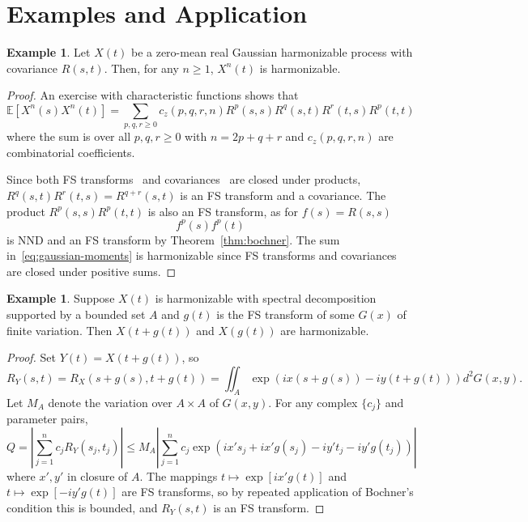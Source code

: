 \documentclass[11pt]{article}
\theoremstyle{plain}
\theoremstyle{definition}
\newtheorem{example}[theorem]{Example}
\theoremstyle{remark}
\begin{document}
\section{Examples and Application}

\begin{example}
Let $X(t)$ be a zero-mean real Gaussian harmonizable process with covariance $R(s,t)$. Then, for any $n \geq 1$, $X^n(t)$ is harmonizable.
\end{example}

\begin{proof}
An exercise with characteristic functions shows that
\begin{equation}
\mathbb{E}[X^n(s)X^n(t)] = \sum_{p, q, r \geq 0} c_z(p, q, r, n) R^p(s, s) R^q(s, t) R^r(t, s) R^p(t, t)
\label{eq:gaussian-moments}
\end{equation}
where the sum is over all $p, q, r \geq 0$ with $n = 2p + q + r$ and $c_z(p, q, r, n)$ are combinatorial coefficients.

Since both FS transforms~\cite[p.151]{bochner1934fst} and covariances~\cite[p.468]{loeve1955probability} are closed under products, $R^q(s,t) R^r(t,s) = R^{q+r}(s,t)$ is an FS transform and a covariance. The product $R^p(s,s) R^p(t,t)$ is also an FS transform, as for $f(s) = R(s,s)$
\[
f^p(s) f^p(t)
\]
is NND and an FS transform by Theorem~\ref{thm:bochner}. The sum in~\eqref{eq:gaussian-moments} is harmonizable since FS transforms and covariances are closed under positive sums.
\end{proof}

\begin{example}
\label{ex:composition}
Suppose $X(t)$ is harmonizable with spectral decomposition supported by a bounded set $A$ and $g(t)$ is the FS transform of some $G(x)$ of finite variation. Then $X(t+g(t))$ and $X(g(t))$ are harmonizable.
\end{example}

\begin{proof}
Set $Y(t) = X(t + g(t))$, so
\[
R_Y(s, t) = R_X(s + g(s), t + g(t)) = \iint_A \exp\left(ix(s+g(s)) - iy(t+g(t))\right) d^2G(x, y).
\]
Let $M_A$ denote the variation over $A \times A$ of $G(x, y)$. For any complex $\{c_j\}$ and parameter pairs,
\[
Q = \left|\sum_{j=1}^n c_j R_Y(s_j, t_j)\right| \leq M_A \left|\sum_{j=1}^n c_j \exp\left(ix's_j + ix' g(s_j) - iy' t_j - iy' g(t_j)\right)\right|
\]
where $x',y'$ in closure of $A$. The mappings $t \mapsto \exp[ix' g(t)]$ and $t \mapsto \exp[-iy' g(t)]$ are FS transforms, so by repeated application of Bochner's condition this is bounded, and $R_Y(s, t)$ is an FS transform.
\end{proof}
\end{document}
